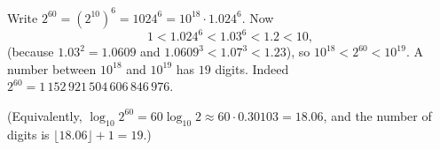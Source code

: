 Write $2^{60}=\left(2^{10}\right)^6=1024^6=10^{18}\cdot1.024^6$. Now
\[
1<1.024^6<1.03^6<1.2<10,
\]
(because $1.03^2=1.0609$ and $1.0609^3<1.07^3<1.23$), so $10^{18}<2^{60}<10^{19}$. A number between $10^{18}$ and $10^{19}$ has $\boxed{19}$ digits. Indeed $2^{60}=1\,152\,921\,504\,606\,846\,976$.

(Equivalently, $\log_{10}2^{60}=60\log_{10}2\approx60\cdot0.30103=18.06$, and the number of digits is $\lfloor18.06\rfloor+1=19$.)
